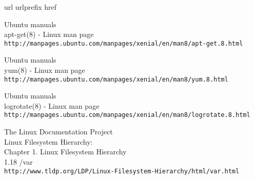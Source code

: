 \begin{thebibliography}{10}
\expandafter\ifx\csname url\endcsname\relax
  \def\url#1{\texttt{#1}}\fi
\expandafter\ifx\csname urlprefix\endcsname\relax\def\urlprefix{URL }\fi
\expandafter\ifx\csname href\endcsname\relax
  \def\href#1#2{#2} \def\path#1{#1}\fi

Ubuntu manuals\\
apt-get(8) - Linux man page\\
  \url{http://manpages.ubuntu.com/manpages/xenial/en/man8/apt-get.8.html}

Ubuntu manuals\\
yum(8) - Linux man page\\
  \url{http://manpages.ubuntu.com/manpages/xenial/en/man8/yum.8.html}

Ubuntu manuals\\
logrotate(8) - Linux man page\\
  \url{http://manpages.ubuntu.com/manpages/xenial/en/man8/logrotate.8.html}

The Linux Documentation Project\\
Linux Filesystem Hierarchy:\\
Chapter 1. Linux Filesystem Hierarchy\\
1.18 \slash var \\
  \url{http://www.tldp.org/LDP/Linux-Filesystem-Hierarchy/html/var.html}

\end{thebibliography}
